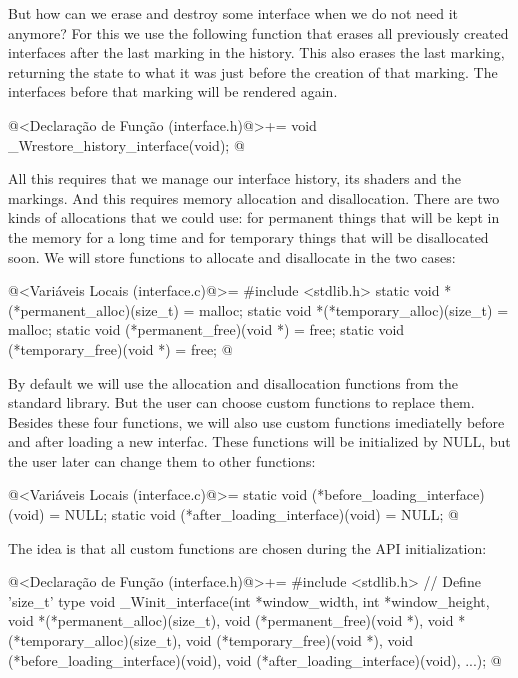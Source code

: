 But how can we erase and destroy some interface when we do not need it
anymore? For this we use the following function that erases all
previously created interfaces after the last marking in the
history. This also erases the last marking, returning the state to
what it was just before the creation of that marking. The interfaces
before that marking will be rendered again.

\iniciocodigo
@<Declaração de Função (interface.h)@>+=
void _Wrestore_history_interface(void);
@
\fimcodigo

All this requires that we manage our interface history, its shaders
and the markings.  And this requires memory allocation and
disallocation. There are two kinds of allocations that we could use:
for permanent things that will be kept in the memory for a long time
and for temporary things that will be disallocated soon. We will store
functions to allocate and disallocate in the two cases:

\iniciocodigo
@<Variáveis Locais (interface.c)@>=
#include <stdlib.h>
static void *(*permanent_alloc)(size_t) = malloc;
static void *(*temporary_alloc)(size_t) = malloc;
static void (*permanent_free)(void *) = free;
static void (*temporary_free)(void *) = free;
@
\fimcodigo

By default we will use the allocation and disallocation functions from
the standard library. But the user can choose custom functions to
replace them. Besides these four functions, we will also use custom
functions imediatelly before and after loading a new interfac. These
functions will be initialized by NULL, but the user later can change
them to other functions:

\iniciocodigo
@<Variáveis Locais (interface.c)@>=
static void (*before_loading_interface)(void) = NULL;
static void (*after_loading_interface)(void) = NULL;
@
\fimcodigo

The idea is that all custom functions are chosen during the API
initialization:

\iniciocodigo
@<Declaração de Função (interface.h)@>+=
#include <stdlib.h> // Define  'size_t' type
void _Winit_interface(int *window_width, int *window_height,
                      void *(*permanent_alloc)(size_t),
                      void (*permanent_free)(void *),
                      void *(*temporary_alloc)(size_t),
                      void (*temporary_free)(void *),
                      void (*before_loading_interface)(void),
                      void (*after_loading_interface)(void),
                      ...);
@
\fimcodigo

